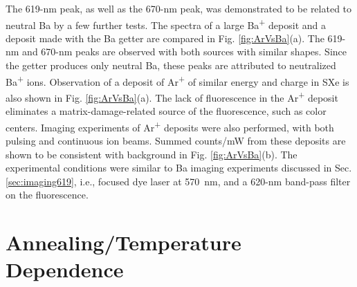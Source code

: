 The 619-nm peak, as well as the 670-nm peak, was demonstrated to be related to neutral Ba by a few further tests.  The spectra of a large Ba\textsuperscript{+} deposit and a deposit made with the Ba getter are compared in Fig. \ref{fig:ArVsBa}(a).  The 619-nm and 670-nm peaks are observed with both sources with similar shapes.  Since the getter produces only neutral Ba, these peaks are attributed to neutralized Ba\textsuperscript{+} ions.  Observation of a deposit of Ar\textsuperscript{+} of similar energy and charge in SXe is also shown in Fig. \ref{fig:ArVsBa}(a).  The lack of fluorescence in the Ar\textsuperscript{+} deposit eliminates a matrix-damage-related source of the fluorescence, such as color centers.  Imaging experiments of Ar\textsuperscript{+} deposits were also performed, with both pulsing and continuous ion beams.  Summed counts/mW from these deposits are shown to be consistent with background in Fig. \ref{fig:ArVsBa}(b).  The experimental conditions were similar to Ba imaging experiments discussed in Sec. \ref{sec:imaging619}, i.e., focused dye laser at 570~nm, and a 620-nm band-pass filter on the fluorescence.




\section{Annealing/Temperature Dependence}
\label{sec:tempanneal}



